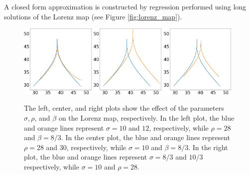 A closed form approximation is constructed by regression performed using long solutions 
of the Lorenz map (see Figure \ref{fig:lorenz_map}). 
\begin{figure}
    \centering
    \includegraphics[width=0.32\textwidth]{lorenz_zmax_sigma.png}
    \hspace{0.005\textwidth}
    \includegraphics[width=0.32\textwidth]{lorenz_zmax_rho.png}
    \hspace{0.005\textwidth}
    \includegraphics[width=0.32\textwidth]{lorenz_zmax_beta.png}
    \caption{
The left, center, and right plots show the effect of the
    parameters $\sigma, \rho$, and $\beta$ on the Lorenz map, respectively.
    In the left plot, the blue and orange lines represent
    $\sigma=10$ and $12$, respectively, while $\rho  = 28$ and $\beta = 8/3.$
    In the center plot, the blue and orange lines represent
    $\rho=28$ and $30$, respectively, while $\sigma = 10$ and $\beta  = 8/3.$ 
    In the right plot, the blue and orange lines represent
    $\sigma=8/3$ and $10/3$ respectively, while $\sigma = 10$ and 
		$\rho = 28.$}
    \label{fig:lorenz_params}
\end{figure}

